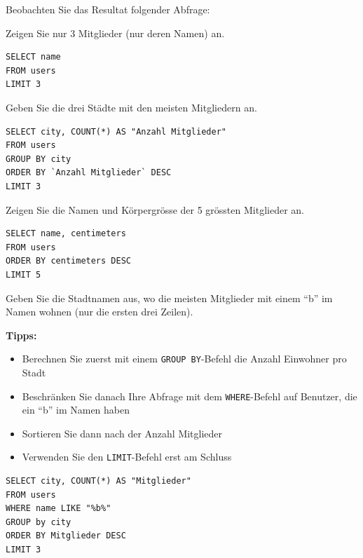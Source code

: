 Beobachten Sie das Resultat folgender Abfrage:

\begin{myexercise}
  Zeigen Sie nur 3 Mitglieder (nur deren Namen) an.
  \begin{myanswer}
    \begin{lstlisting}
SELECT name
FROM users
LIMIT 3
\end{lstlisting}
  \end{myanswer}
\end{myexercise}

\begin{myexercise}
  Geben Sie die drei Städte mit den meisten Mitgliedern an.
  \begin{myanswer}
    \begin{lstlisting}
SELECT city, COUNT(*) AS "Anzahl Mitglieder"
FROM users
GROUP BY city
ORDER BY `Anzahl Mitglieder` DESC
LIMIT 3
\end{lstlisting}
  \end{myanswer}
\end{myexercise}

\begin{myexercise}
  Zeigen Sie die Namen und Körpergrösse der 5 grössten Mitglieder an.
  \begin{myanswer}
    \begin{lstlisting}
SELECT name, centimeters
FROM users
ORDER BY centimeters DESC
LIMIT 5
\end{lstlisting}
  \end{myanswer}
\end{myexercise}

\begin{mychallenge}
  Geben Sie die Stadtnamen aus, wo die meisten Mitglieder mit einem ``b'' im Namen wohnen (nur die ersten drei Zeilen).

  \textbf{Tipps:}
  \begin{itemize}
    \item Berechnen Sie zuerst mit einem \lstinline|GROUP BY|-Befehl die Anzahl Einwohner pro Stadt
    \item Beschränken Sie danach Ihre Abfrage mit dem \lstinline|WHERE|-Befehl auf Benutzer, die ein ``b'' im Namen haben
    \item Sortieren Sie dann nach der Anzahl Mitglieder
    \item Verwenden Sie den \lstinline|LIMIT|-Befehl erst am Schluss
  \end{itemize}

  \begin{myanswer}
    \begin{lstlisting}
SELECT city, COUNT(*) AS "Mitglieder"
FROM users 
WHERE name LIKE "%b%" 
GROUP by city 
ORDER BY Mitglieder DESC
LIMIT 3
\end{lstlisting}
  \end{myanswer}
\end{mychallenge}

